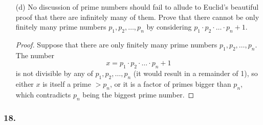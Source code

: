 \documentclass{article}
\newtheorem*{lemma}{Lemma}
\begin{document}
\begin{enumerate}
\begin{lemma}
		Let $x$ be some natural number. Then $x$ can be written as a unique product of primes, say $p_1, p_2, \dots, p_n$. Then \[x^k = (p_1 \cdot p_2 \cdot \dots \cdot p_n)^k = {p_1}^k \cdot {p_2}^k \cdot \dots \cdot {p_n}^k \]so each prime in the factorization of $x^k$ appears a factor of $k$ times.

		Now suppose that for some natural number $y$, each prime in its factorization appears a factor of $k$ times. Then \[y = {p_1}^k \cdot {p_2}^k \cdot \dots \cdot {p_n}^k = (p_1 \cdot p_2 \cdot \dots \cdot p_n)^k \]so $y$ is the $k$-th power of a natural number $x = (p_1 \cdot p_2 \cdot \dots \cdot p_n)$.
	\end{lemma}
	\begin{proof}
		Suppose that for some natural number $n$, $\sqrt[k]{n}$ is rational. Then $\sqrt[k]{n} = \frac{a}{b}$ for some natural numbers $a$ and $b$, and $nb^k = a^k$. Then the factorization of $nb^k$ is the same as the factorization of $a^k$, and in the factorizations of $a^k$ and $b^k$ each prime appears a factor of $k$ times. Then in the factorization of $n$ each prime also appears a factor of $k$ times, so $n$ is the $k$-th power of another natural number.
	\end{proof}
	\item[(d)] No discussion of prime numbers should fail to allude to Euclid's beautiful proof that there are infinitely many of them. Prove that there cannot be only finitely many prime numbers $p_1, p_2, \dots, p_n$ by considering $p_1 \cdot p_2 \cdot \dots \cdot p_n + 1$.
	\begin{proof}
		Suppose that there are only finitely many prime numbers $p_1, p_2, \dots, p_n$. The number \[x = p_1 \cdot p_2 \cdot \dots \cdot p_n + 1\] is not divisible by any of $p_1, p_2, \dots, p_n$ (it would result in a remainder of 1), so either $x$ is itself a prime $> p_n$, or it is a factor of primes bigger than $p_n$, which contradicts $p_n$ being the biggest prime number.
	\end{proof}
\end{enumerate}

\subsubsection*{18.}
\end{document}
